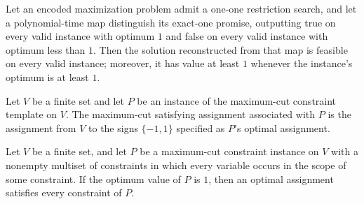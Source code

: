 \begin{theorem}
\label{FABL.OneOneRestrictionSearch.approximationOfDistinguisher}
\leanok
{}
Let an encoded maximization problem admit a one-one restriction search, and let a
polynomial-time map distinguish its exact-one promise, outputting true on every valid
instance with optimum $1$ and false on every valid instance with optimum less than $1$.
Then the solution reconstructed from that map is feasible on every valid instance;
moreover, it has value at least $1$ whenever the instance's optimum is at least $1$.
\end{theorem}

\begin{definition}
\label{FABL.maxCutSatisfyingAssignment}
\leanok
{}
Let $V$ be a finite set and let $P$ be an instance of the maximum-cut constraint
template on $V$. The maximum-cut satisfying assignment associated with $P$ is the
assignment from $V$ to the signs $\{ -1,1\}$ specified as $P$'s optimal assignment.
\end{definition}

\begin{theorem}
\label{FABL.maxCutSatisfyingAssignment_fullySatisfied}
\leanok
{}
Let $V$ be a finite set, and let $P$ be a maximum-cut constraint instance on $V$ with a
nonempty multiset of constraints in which every variable occurs in the scope of some
constraint. If the optimum value of $P$ is $1$, then an optimal assignment satisfies
every constraint of $P$.
\end{theorem}

